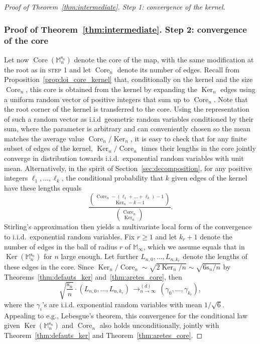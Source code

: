 \documentclass[11pt]{article}
\newcommand{\eg}{e.g.,\xspace}
\theoremstyle{plain}
\theoremstyle{definition}
\theoremstyle{remark}
\newcommand{\Mapb}{\mathbb{M}}
\newcommand{\spar}{\mathrm{s}}
\DeclareMathOperator{\Core}{Core}
\DeclareMathOperator{\Ker}{Ker}
\newcommand{\cvloi}[1][n]{\,\mathop{\longrightarrow}^{(d)}_{#1 \to \infty}\,}
\begin{document}
\begin{proof}[Proof of Theorem~\ref{thm:intermediate}. Step 1: convergence of the kernel]
\subsubsection*{Proof of Theorem~\ref{thm:intermediate}. Step 2: convergence of the core}
Let now $\Core(\Mapb_n^{\spar_n})$ denote the core of the map, with the same modification at the root as in \textsc{step 1} and let $\Core_n$ denote its number of edges.
Recall from Proposition~\ref{prop:loi_core_kernel} that, conditionally on the kernel and the size $\Core_n$, this core is obtained from the kernel by expanding the $\Ker_n$ edges using a uniform random vector of positive integers that sum up to $\Core_n$. Note that the root corner of the kernel is transferred to the core.
Using the representation of such a random vector as i.i.d~geometric random variables conditioned by their sum, where the parameter is arbitrary and can conveniently chosen so the mean matches the average value $\Core_n/\Ker_n$, it is easy to check that for any finite subset of edges of the kernel, $\Ker_n / \Core_n$ times their lengths in the core jointly converge in distribution towards i.i.d.~exponential random variables with unit mean. Alternatively, in the spirit of Section~\ref{sec:decomposition}, for any positive integers $\ell_1, \dots, \ell_k$, the conditional probability that $k$ given edges of the kernel have these lengths equals
\[
\frac{\binom{\Core_n-(\ell_1+\dots+\ell_k)-1}{\Ker_n-k-1}}{\binom{\Core_n}{\Ker_n}}.
\]
Stirling's approximation then yields a multivariate local form of the convergence to i.i.d.~exponential random variables.
Fix $r \ge 1$ and let $k_r+1$ denote the number of edges in the ball of radius $r$ of $\Mapb_\infty$, which we assume equals that in $\Ker(\Mapb_n^{\spar_n})$ for $n$ large enough. Let further $L_{n,0}, \dots, L_{n,k_r}$ denote the lengths of these edges in the core. Since $\Ker_n / \Core_n \sim \sqrt{2\Ker_n/n} \sim \sqrt{6\spar_n/n}$ by Theorems~\ref{thm:defauts_ker} and~\ref{thm:aretes_core}, then
\begin{equation}\label{eq:convergence_longueurs_core}
\sqrt{\frac{\spar_n}{n}} \cdot \left(L_{n,0}, \dots, L_{n,k_r}\right) \cvloi (\gamma_0, \dots, \gamma_{k_r}),
\end{equation}
where the $\gamma_i$'s are i.i.d. exponential random variables with mean $1/\sqrt{6}$. Appealing to \eg Lebesgue's theorem, this convergence for the conditional law given $\Ker(\Mapb_n^{\spar_n})$ and $\Core_n$ also holds unconditionally, jointly with Theorem~\ref{thm:defauts_ker} and Theorem~\ref{thm:aretes_core}.


\end{proof}
\end{document}
